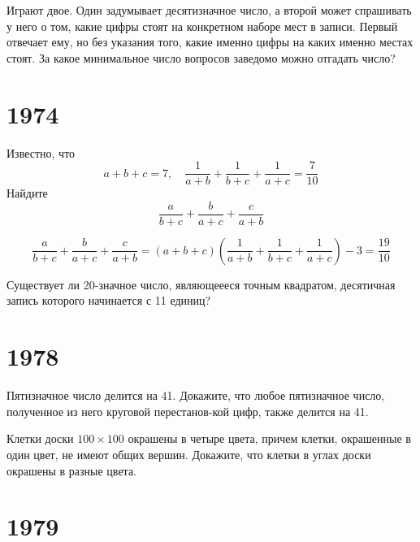 \documentclass[11pt, a4paper]{template}
\begin{document}
\begin{exercise}
Играют двое. Один задумывает десятизначное число, а второй может спрашивать у него о том, какие цифры стоят на конкретном наборе мест в записи. Первый отвечает ему, но без указания того, какие именно цифры на каких именно местах стоят. За какое минимальное число вопросов заведомо можно отгадать число?
\end{exercise}

\chapter{1974}

\begin{exercise}
Известно, что
$$
a+b+c = 7, \quad \frac{1}{a+b}+\frac{1}{b+c}+\frac{1}{a+c} = \frac{7}{10}
$$
Найдите
$$
\frac{a}{b+c}+\frac{b}{a+c}+\frac{c}{a+b}
$$
\end{exercise}

\begin{solution}
$$
\frac{a}{b+c}+\frac{b}{a+c}+\frac{c}{a+b} = (a+b+c)\left( \frac{1}{a+b}+\frac{1}{b+c}+\frac{1}{a+c} \right) - 3 = \frac{19}{10}
$$
\end{solution}

\begin{exercise}
Существует ли 20-значное число, являющеееся точным квадратом, десятичная запись которого начинается с 11 единиц?
\end{exercise}

\chapter{1978}

\begin{exercise}
Пятизначное число делится на 41. Докажите, что любое пятизначное число, полученное из него круговой перестанов-кой цифр, также делится на 41.
\end{exercise}

\begin{exercise}
Клетки доски $100 \times 100$ окрашены в четыре цвета, причем клетки, окрашенные в один цвет, не имеют общих вершин. Докажите, что клетки в углах доски окрашены в разные цвета.
\end{exercise}

\begin{solution}

\end{solution}

\chapter{1979}
\end{document}
